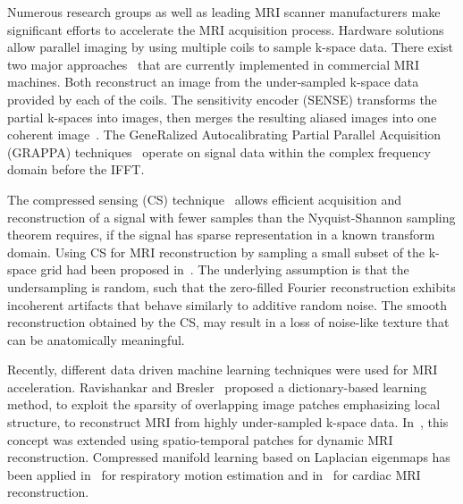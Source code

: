 \documentclass[review]{elsarticle}
\begin{document}
Numerous research groups as well as leading MRI scanner manufacturers make significant efforts to accelerate the MRI acquisition process. Hardware solutions allow parallel imaging by using multiple coils \cite{roemer1990nmr} to sample k-space data. There exist two major approaches~\cite{Deshmane2012} that are currently implemented in commercial MRI machines. Both reconstruct an image from the under-sampled k-space data provided by each of the coils. The sensitivity encoder (SENSE) transforms the partial k-spaces into images, then merges the resulting aliased images into one coherent image~\cite{pruessmann1999sense}. 
The GeneRalized Autocalibrating Partial Parallel Acquisition (GRAPPA) techniques~\cite{griswold2002generalized} operate on signal data within the complex frequency domain before the IFFT.

The compressed sensing (CS) technique~\cite{donoho2006compressed} allows efficient acquisition and reconstruction of a signal with fewer samples than the Nyquist-Shannon sampling theorem requires, if the signal has sparse representation in a known transform domain. Using CS for MRI reconstruction by sampling a small subset of the k-space grid had been proposed in~\cite{lustig2007sparse}. The underlying assumption is that the undersampling is random, such that the zero-filled Fourier reconstruction exhibits incoherent artifacts that behave similarly to additive random noise. 
The smooth reconstruction obtained by the CS, may result in a loss of noise-like texture that can be anatomically meaningful.
 
Recently, different data driven machine learning techniques were used for MRI acceleration. 
Ravishankar and Bresler~\cite{ravishankar2011mr} proposed a dictionary-based learning method, to exploit the sparsity of overlapping image patches emphasizing local structure, to reconstruct MRI from highly under-sampled k-space data. In~\cite{caballero2014dictionary}, this concept was extended using spatio-temporal patches for dynamic MRI reconstruction.
Compressed manifold learning based on Laplacian eigenmaps has been applied in~\cite{usman2014compressive} for respiratory motion estimation and in~\cite{bhatia2015fast} for cardiac MRI reconstruction.
\end{document}
